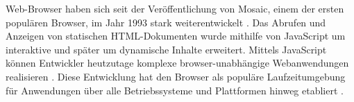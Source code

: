 Web-Browser haben sich seit der Veröffentlichung von Mosaic, einem der ersten populären Browser, im Jahr 1993 stark weiterentwickelt \cite{EvolutionOfTheWebBrowser}. Das Abrufen und Anzeigen von statischen HTML-Dokumenten wurde mithilfe von JavaScript um interaktive und später um dynamische Inhalte erweitert. Mittels JavaScript können Entwickler heutzutage komplexe browser-unabhängige Webanwendungen realisieren \cite{SinglePageApplication}. Diese Entwicklung hat den Browser als populäre Laufzeitumgebung für Anwendungen über alle Betriebssysteme und Plattformen hinweg etabliert \cite{TheWebAsAnApplicationPlatform}.



\vspace{\baselineskip}

